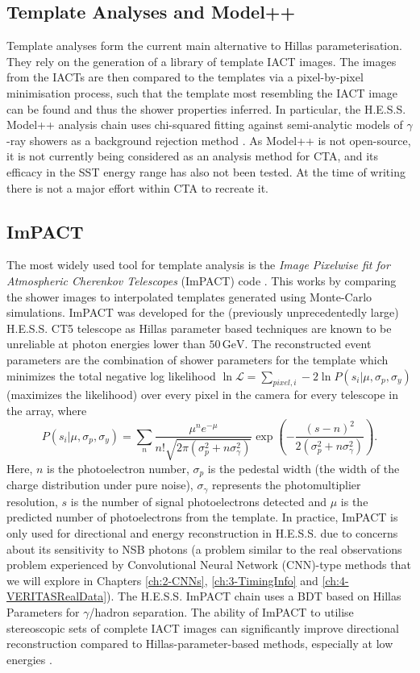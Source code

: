 \subsection{Template Analyses and Model++}
Template analyses \cite{model++} \cite{cat} \cite{3danalysis}  \cite{impact} form the current main alternative to Hillas parameterisation. They rely on the generation of a library of template IACT images. The images from the IACTs are then compared to the templates via a pixel-by-pixel minimisation process, such that the template most resembling the IACT image can be found and thus the shower properties inferred. In particular, the H.E.S.S. Model++ analysis chain uses chi-squared fitting against semi-analytic models of $\gamma$-ray showers as a background rejection method \cite{model++}. As Model++ is not open-source, it is not currently being considered as an analysis method for CTA, and its efficacy in the SST energy range has also not been tested. At the time of writing there is not a major effort within CTA to recreate it.

\subsection{ImPACT}
The most widely used tool for template analysis is the \textit{Image Pixelwise fit for Atmospheric Cherenkov Telescopes} (ImPACT) code \cite{impact}. This works by comparing the shower images to interpolated templates generated using Monte-Carlo simulations. ImPACT was developed for the (previously unprecedentedly large) H.E.S.S. CT5 telescope as Hillas parameter based techniques are known to be unreliable at photon energies lower than $\mathrm{50\,GeV}$. The reconstructed event parameters are the combination of shower parameters for the template which minimizes the total negative log likelihood $\ln\mathcal{L}=\sum_{pixel,i}-2\ln{P(s_i|\mu,\sigma_p,\sigma_y)}$ (maximizes the likelihood) over every pixel in the camera for every telescope in the array, where
\begin{equation}
P(s_i|\mu,\sigma_p,\sigma_y)=\sum_n \frac{\mu^n e^{-\mu}}{n!\sqrt{2\pi (\sigma_p^2+n\sigma_{\gamma}^2)}} \exp \left(-\frac{(s-n)^2}{2(\sigma_p^2 + n \sigma_{\gamma}^2)} \right).
\end{equation}
Here, $n$ is the photoelectron number, $\sigma_p$ is the pedestal width (the width of the charge distribution under pure noise), $\sigma_{\gamma}$ represents the photomultiplier resolution, $s$ is the number of signal photoelectrons detected and $\mu$ is the predicted number of photoelectrons from the template. In practice, ImPACT is only used for directional and energy reconstruction in H.E.S.S. due to concerns about its sensitivity to NSB photons (a problem similar to the real observations problem experienced by Convolutional Neural Network (CNN)-type methods that we will explore in Chapters \ref{ch:2-CNNs}, \ref{ch:3-TimingInfo} and \ref{ch:4-VERITASRealData}). The H.E.S.S. ImPACT chain uses a BDT based on Hillas Parameters for $\gamma$/hadron separation. The ability of ImPACT to utilise stereoscopic sets of complete IACT images can significantly improve directional reconstruction compared to Hillas-parameter-based methods, especially at low energies \cite{impact}.

